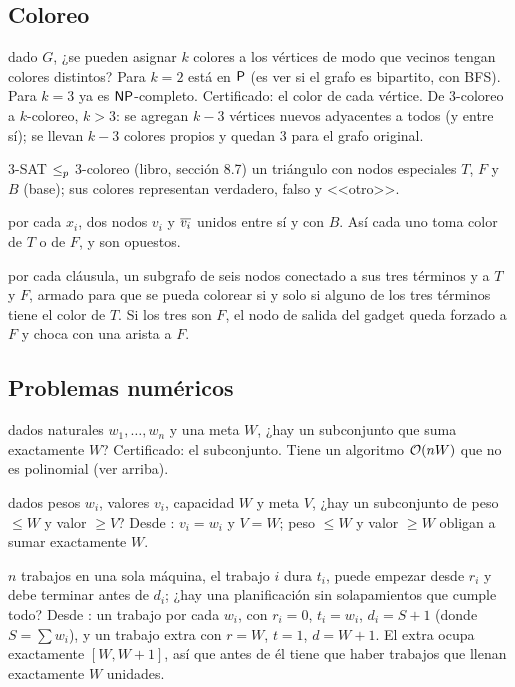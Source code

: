 \subsection{Coloreo}

 dado $G$, ¿se pueden asignar $k$ colores a los vértices de modo que vecinos tengan colores distintos? Para $k=2$ está en $\mathsf{P}$ (es ver si el grafo es bipartito, con BFS). Para $k=3$ ya es $\mathsf{NP}$-completo. Certificado: el color de cada vértice. De $3$-coloreo a $k$-coloreo, $k>3$: se agregan $k-3$ vértices nuevos adyacentes a todos (y entre sí); se llevan $k-3$ colores propios y quedan 3 para el grafo original.

\begin{problema}{3-SAT $\le_{p}$ 3-coloreo (libro, sección 8.7)}
 un triángulo con nodos especiales $T$, $F$ y $B$ (base); sus colores representan verdadero, falso y <<otro>>.

 por cada $x_i$, dos nodos $v_i$ y $\overline{v_i}$ unidos entre sí y con $B$. Así cada uno toma color de $T$ o de $F$, y son opuestos.

 por cada cláusula, un subgrafo de seis nodos conectado a sus tres términos y a $T$ y $F$, armado para que se pueda colorear si y solo si alguno de los tres términos tiene el color de $T$. Si los tres son $F$, el nodo de salida del gadget queda forzado a $F$ y choca con una arista a $F$.
\end{problema}

\subsection{Problemas numéricos}

\npdato{\npSS} dados naturales $w_1,\dots,w_n$ y una meta $W$, ¿hay un subconjunto que suma exactamente $W$? Certificado: el subconjunto. Tiene un algoritmo $\mathcal{O}(nW)$ que no es polinomial (ver arriba).

 dados pesos $w_i$, valores $v_i$, capacidad $W$ y meta $V$, ¿hay un subconjunto de peso $\le W$ y valor $\ge V$? Desde \npSS: $v_i=w_i$ y $V=W$; peso $\le W$ y valor $\ge W$ obligan a sumar exactamente $W$.

 $n$ trabajos en una sola máquina, el trabajo $i$ dura $t_i$, puede empezar desde $r_i$ y debe terminar antes de $d_i$; ¿hay una planificación sin solapamientos que cumple todo? Desde \npSS: un trabajo por cada $w_i$, con $r_i=0$, $t_i=w_i$, $d_i=S+1$ (donde $S=\sum w_i$), y un trabajo extra con $r=W$, $t=1$, $d=W+1$. El extra ocupa exactamente $[W,W+1]$, así que antes de él tiene que haber trabajos que llenan exactamente $W$ unidades.


